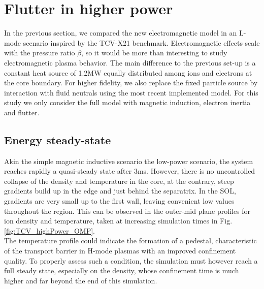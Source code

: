 \section{Flutter in higher power}

In the previous section, we compared the new electromagnetic model in an L-mode scenario inspired by the TCV-X21 benchmark. Electromagnetic effects scale with the pressure ratio $\beta$, so it would be more than interesting to study electromagnetic plasma behavior. The main difference to the previous set-up is a constant heat source of 1.2MW equally distributed among ions and electrons at the core boundary. For higher fidelity, we also replace the fixed particle source by interaction with fluid neutrals using the most recent implemented model\cite{quadri2024}. For this study we only consider the full model with magnetic induction, electron inertia and flutter. \\



\subsection{Energy steady-state}

Akin the simple magnetic inductive scenario the low-power scenario, the system reaches rapidly a quasi-steady state after 3ms. However, there is no uncontrolled collapse of the density and temperature in the core, at the contrary, steep gradients build up in the edge and just behind the separatrix. In the SOL, gradients are very small up to the first wall, leaving convenient low values throughout the region. This can be observed in the outer-mid plane profiles for ion density and temperature, taken at increasing simulation times in Fig. \ref{fig:TCV_highPower_OMP}. \\

The temperature profile could indicate the formation of a pedestal, characteristic of the transport barrier in H-mode plasmas with an improved confinement quality. To properly assess such a condition, the simulation must however reach a full steady state, especially on the density, whose confinement time is much higher and far beyond the end of this simulation. \\

